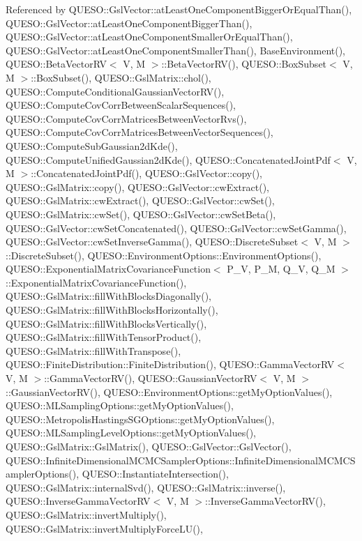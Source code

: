 Referenced by Q\-U\-E\-S\-O\-::\-Gsl\-Vector\-::at\-Least\-One\-Component\-Bigger\-Or\-Equal\-Than(), Q\-U\-E\-S\-O\-::\-Gsl\-Vector\-::at\-Least\-One\-Component\-Bigger\-Than(), Q\-U\-E\-S\-O\-::\-Gsl\-Vector\-::at\-Least\-One\-Component\-Smaller\-Or\-Equal\-Than(), Q\-U\-E\-S\-O\-::\-Gsl\-Vector\-::at\-Least\-One\-Component\-Smaller\-Than(), Base\-Environment(), Q\-U\-E\-S\-O\-::\-Beta\-Vector\-R\-V$<$ V, M $>$\-::\-Beta\-Vector\-R\-V(), Q\-U\-E\-S\-O\-::\-Box\-Subset$<$ V, M $>$\-::\-Box\-Subset(), Q\-U\-E\-S\-O\-::\-Gsl\-Matrix\-::chol(), Q\-U\-E\-S\-O\-::\-Compute\-Conditional\-Gaussian\-Vector\-R\-V(), Q\-U\-E\-S\-O\-::\-Compute\-Cov\-Corr\-Between\-Scalar\-Sequences(), Q\-U\-E\-S\-O\-::\-Compute\-Cov\-Corr\-Matrices\-Between\-Vector\-Rvs(), Q\-U\-E\-S\-O\-::\-Compute\-Cov\-Corr\-Matrices\-Between\-Vector\-Sequences(), Q\-U\-E\-S\-O\-::\-Compute\-Sub\-Gaussian2d\-Kde(), Q\-U\-E\-S\-O\-::\-Compute\-Unified\-Gaussian2d\-Kde(), Q\-U\-E\-S\-O\-::\-Concatenated\-Joint\-Pdf$<$ V, M $>$\-::\-Concatenated\-Joint\-Pdf(), Q\-U\-E\-S\-O\-::\-Gsl\-Vector\-::copy(), Q\-U\-E\-S\-O\-::\-Gsl\-Matrix\-::copy(), Q\-U\-E\-S\-O\-::\-Gsl\-Vector\-::cw\-Extract(), Q\-U\-E\-S\-O\-::\-Gsl\-Matrix\-::cw\-Extract(), Q\-U\-E\-S\-O\-::\-Gsl\-Vector\-::cw\-Set(), Q\-U\-E\-S\-O\-::\-Gsl\-Matrix\-::cw\-Set(), Q\-U\-E\-S\-O\-::\-Gsl\-Vector\-::cw\-Set\-Beta(), Q\-U\-E\-S\-O\-::\-Gsl\-Vector\-::cw\-Set\-Concatenated(), Q\-U\-E\-S\-O\-::\-Gsl\-Vector\-::cw\-Set\-Gamma(), Q\-U\-E\-S\-O\-::\-Gsl\-Vector\-::cw\-Set\-Inverse\-Gamma(), Q\-U\-E\-S\-O\-::\-Discrete\-Subset$<$ V, M $>$\-::\-Discrete\-Subset(), Q\-U\-E\-S\-O\-::\-Environment\-Options\-::\-Environment\-Options(), Q\-U\-E\-S\-O\-::\-Exponential\-Matrix\-Covariance\-Function$<$ P\-\_\-\-V, P\-\_\-\-M, Q\-\_\-\-V, Q\-\_\-\-M $>$\-::\-Exponential\-Matrix\-Covariance\-Function(), Q\-U\-E\-S\-O\-::\-Gsl\-Matrix\-::fill\-With\-Blocks\-Diagonally(), Q\-U\-E\-S\-O\-::\-Gsl\-Matrix\-::fill\-With\-Blocks\-Horizontally(), Q\-U\-E\-S\-O\-::\-Gsl\-Matrix\-::fill\-With\-Blocks\-Vertically(), Q\-U\-E\-S\-O\-::\-Gsl\-Matrix\-::fill\-With\-Tensor\-Product(), Q\-U\-E\-S\-O\-::\-Gsl\-Matrix\-::fill\-With\-Transpose(), Q\-U\-E\-S\-O\-::\-Finite\-Distribution\-::\-Finite\-Distribution(), Q\-U\-E\-S\-O\-::\-Gamma\-Vector\-R\-V$<$ V, M $>$\-::\-Gamma\-Vector\-R\-V(), Q\-U\-E\-S\-O\-::\-Gaussian\-Vector\-R\-V$<$ V, M $>$\-::\-Gaussian\-Vector\-R\-V(), Q\-U\-E\-S\-O\-::\-Environment\-Options\-::get\-My\-Option\-Values(), Q\-U\-E\-S\-O\-::\-M\-L\-Sampling\-Options\-::get\-My\-Option\-Values(), Q\-U\-E\-S\-O\-::\-Metropolis\-Hastings\-S\-G\-Options\-::get\-My\-Option\-Values(), Q\-U\-E\-S\-O\-::\-M\-L\-Sampling\-Level\-Options\-::get\-My\-Option\-Values(), Q\-U\-E\-S\-O\-::\-Gsl\-Matrix\-::\-Gsl\-Matrix(), Q\-U\-E\-S\-O\-::\-Gsl\-Vector\-::\-Gsl\-Vector(), Q\-U\-E\-S\-O\-::\-Infinite\-Dimensional\-M\-C\-M\-C\-Sampler\-Options\-::\-Infinite\-Dimensional\-M\-C\-M\-C\-Sampler\-Options(), Q\-U\-E\-S\-O\-::\-Instantiate\-Intersection(), Q\-U\-E\-S\-O\-::\-Gsl\-Matrix\-::internal\-Svd(), Q\-U\-E\-S\-O\-::\-Gsl\-Matrix\-::inverse(), Q\-U\-E\-S\-O\-::\-Inverse\-Gamma\-Vector\-R\-V$<$ V, M $>$\-::\-Inverse\-Gamma\-Vector\-R\-V(), Q\-U\-E\-S\-O\-::\-Gsl\-Matrix\-::invert\-Multiply(), Q\-U\-E\-S\-O\-::\-Gsl\-Matrix\-::invert\-Multiply\-Force\-L\-U(), 